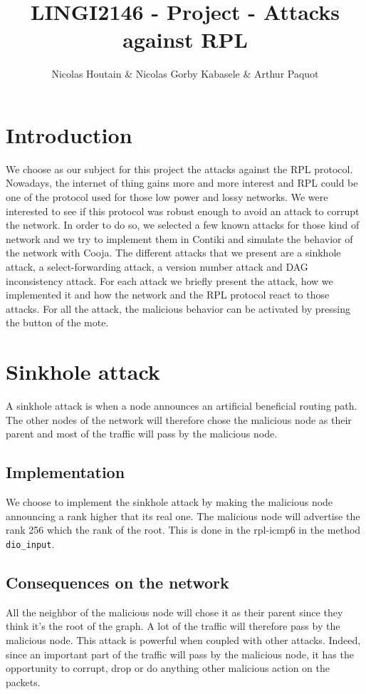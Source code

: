 \documentclass{report}
\title{LINGI2146 - Project - Attacks against RPL}
\author{Nicolas Houtain \& Nicolas Gorby Kabasele \& Arthur Paquot}
\begin{document}
\maketitle
\section{Introduction}
We choose as our subject for this project the attacks against the RPL protocol. Nowadays, the internet of thing gains more and more interest and RPL could be one of the protocol used for those low power and lossy networks. We were interested to see if this protocol was robust enough to avoid an attack to corrupt the network. In order to do so, we selected a few known attacks for those kind of network and we try to implement them in Contiki and simulate the behavior of the network with Cooja. The different attacks that we present are a sinkhole attack, a select-forwarding attack, a version number attack and DAG inconsistency attack. For each attack we briefly present the attack, how we implemented it and how the network and the RPL protocol react to those attacks. For all the attack, the malicious behavior can be activated by pressing the button of the mote.
\section{Sinkhole attack}
A sinkhole attack is when a node announces an artificial beneficial routing path. The other nodes of the network will therefore chose the malicious node as their parent and most of the traffic will pass by the malicious node.
\subsection*{Implementation}
We choose to implement the sinkhole attack by making the malicious node announcing a rank higher that its real one. The malicious node will advertise the rank 256 which the rank of the root. This is done in the rpl-icmp6 in the method \verb#dio_input#.
\subsection*{Consequences on the network}
All the neighbor of the malicious node will chose it as their parent since they think it's the root of the graph. A lot of the traffic will therefore pass by the malicious node. This attack is powerful when coupled with other attacks. Indeed, since an important part of the traffic will pass by the malicious node, it has the opportunity to corrupt, drop or do anything other malicious action on the packets.
\end{document}
